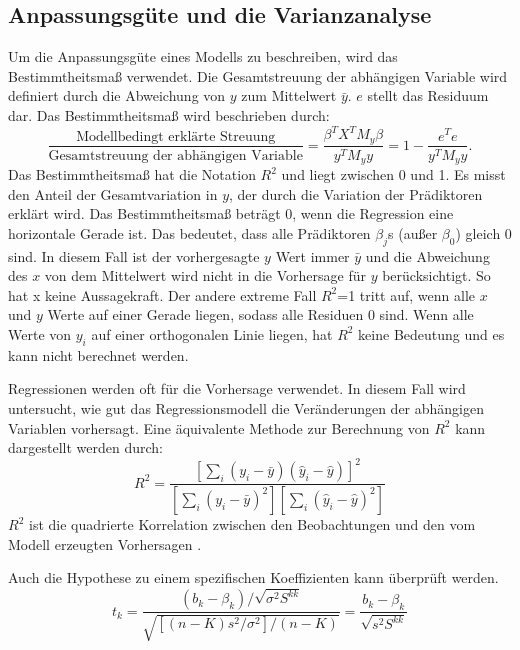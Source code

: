 \subsection{Anpassungsgüte und die Varianzanalyse}
\label{AnpassungsgüteUndDieVarianzanalyse}
Um die Anpassungsgüte eines Modells zu beschreiben, wird das Bestimmtheitsmaß verwendet. Die Gesamtstreuung der abhängigen Variable wird definiert durch die Abweichung von \( y \) zum Mittelwert \( \bar{y} \). \( e \) stellt das Residuum dar. Das Bestimmtheitsmaß wird beschrieben durch: 
\begin{equation}
\frac{\text{Modellbedingt erklärte Streuung}}{\text{Gesamtstreuung der abhängigen Variable}} = \frac{\beta^{T}X^{T}M_{y}\beta}{y^{T}M_{y}y} = 1 - \frac{e^{T}e}{y^{T}M_{y}y}.
\label{R2kurz}
\end{equation}
Das Bestimmtheitsmaß hat die Notation  \( R^2 \) und liegt zwischen 0 und 1. Es misst den Anteil der Gesamtvariation in \(y\), der durch die Variation der Prädiktoren erklärt wird. Das Bestimmtheitsmaß beträgt 0, wenn die Regression eine horizontale Gerade ist. Das bedeutet, dass alle Prädiktoren $\beta_j$s (außer $\beta_0$) gleich 0 sind. In diesem Fall ist der vorhergesagte $y$ Wert immer $\bar{y}$ und die Abweichung des $x$ von dem Mittelwert wird nicht in die Vorhersage für $y$ berücksichtigt. So hat x keine Aussagekraft. Der andere extreme Fall \(R^2\)=1 tritt auf, wenn alle \(x\) und \(y\) Werte auf einer Gerade liegen, sodass alle Residuen 0 sind. Wenn alle Werte von $y_i$ auf einer orthogonalen Linie liegen, hat $R^2$ keine Bedeutung und es kann nicht berechnet werden.  \par 
Regressionen werden oft für die Vorhersage verwendet. 
In diesem Fall wird untersucht, wie gut das Regressionsmodell die Veränderungen der abhängigen Variablen vorhersagt. Eine äquivalente Methode zur Berechnung von $R^2$ kann dargestellt werden durch: 
\begin{equation}
R^2 = \frac{\left[\sum_{i}(y_i - \bar{y})(\hat{y}_i - \hat{y})\right]^2}{\left[\sum_{i}(y_i - \bar{y})^2\right]\left[\sum_{i}(\hat{y}_i - \hat{y})^2\right]}
\label{R2Formel}
\end{equation}
$R^2$ ist die quadrierte Korrelation zwischen den Beobachtungen und den vom Modell erzeugten Vorhersagen \cite{greene2003econometric}.\par
Auch die Hypothese zu einem spezifischen Koeffizienten kann überprüft werden.  
\begin{equation}
t_k = \frac{(b_k - \beta_k)/\sqrt{\sigma^2 S^{kk}}}{\sqrt{[(n-K)s^2/\sigma^2]/(n-K)}} = \frac{b_k - \beta_k}{\sqrt{s^2 S^{kk}}}
\label{eq:tk_formula}
\end{equation}
